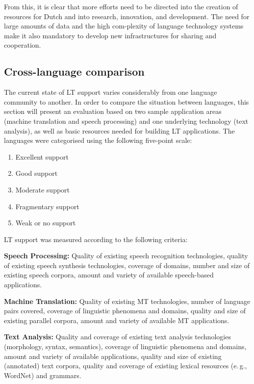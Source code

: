 \documentclass[]{../../metanetpaper}
\begin{document}
\begin{multicols}{2}
From this, it is clear that more efforts need to be directed into the creation of resources for Dutch and into research, innovation, and development. The need for large amounts of data and the high com-plexity of language technology systems make it also mandatory to develop new infrastructures for sharing and cooperation.

\subsection{Cross-language comparison}

The current state of LT support varies considerably from one language community to another. In order to compare the situation between languages, this section will present an evaluation based on two sample application areas (machine translation and speech processing) and one underlying technology (text analysis), as well as basic resources needed for building LT applications. The languages were categorised using the following five-point scale: 

\begin{enumerate}
\item Excellent support
\item Good support
\item Moderate support
\item Fragmentary support
\item Weak or no support
\end{enumerate}

LT support was measured according to the following criteria:

\textbf{Speech Processing:} Quality of existing speech recognition technologies, quality of existing speech synthesis technologies, coverage of domains, number and size of existing speech corpora, amount and variety of available speech-based applications.

\textbf{Machine Translation:} Quality of existing MT technologies, number of language pairs covered, coverage of linguistic phenomena and domains, quality and size of existing parallel corpora, amount and variety of available MT applications.

\textbf{Text Analysis:} Quality and coverage of existing text analysis technologies (morphology, syntax, semantics), coverage of linguistic phenomena and domains, amount and variety of available applications, quality and size of existing (annotated) text corpora, quality and coverage of existing lexical resources (e.\,g., WordNet) and grammars.


\end{multicols}
\end{document}
